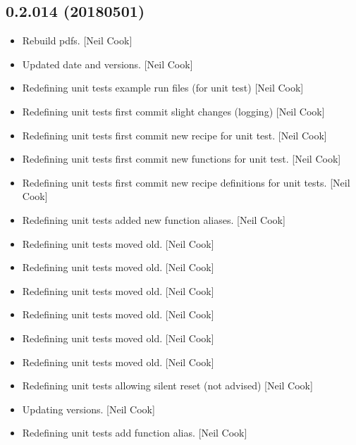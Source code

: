 \documentclass[a4paper,10pt,english]{report}
\begin{document}
\subsection{0.2.014 (2018\sphinxhyphen{}05\sphinxhyphen{}01)}
\label{\detokenize{misc/changelog:id466}}\begin{itemize}
\item {} 
Rebuild pdfs. {[}Neil Cook{]}

\item {} 
Updated date and versions. {[}Neil Cook{]}

\item {} 
Redefining unit tests \sphinxhyphen{} example run files (for unit test) {[}Neil Cook{]}

\item {} 
Redefining unit tests \sphinxhyphen{} first commit \sphinxhyphen{} slight changes (logging) {[}Neil
Cook{]}

\item {} 
Redefining unit tests \sphinxhyphen{} first commit \sphinxhyphen{} new recipe for unit test. {[}Neil
Cook{]}

\item {} 
Redefining unit tests \sphinxhyphen{} first commit \sphinxhyphen{} new functions for unit test.
{[}Neil Cook{]}

\item {} 
Redefining unit tests \sphinxhyphen{} first commit \sphinxhyphen{} new recipe definitions for unit
tests. {[}Neil Cook{]}

\item {} 
Redefining unit tests \sphinxhyphen{} added new function aliases. {[}Neil Cook{]}

\item {} 
Redefining unit tests \sphinxhyphen{} moved old. {[}Neil Cook{]}

\item {} 
Redefining unit tests \sphinxhyphen{} moved old. {[}Neil Cook{]}

\item {} 
Redefining unit tests \sphinxhyphen{} moved old. {[}Neil Cook{]}

\item {} 
Redefining unit tests \sphinxhyphen{} moved old. {[}Neil Cook{]}

\item {} 
Redefining unit tests \sphinxhyphen{} moved old. {[}Neil Cook{]}

\item {} 
Redefining unit tests \sphinxhyphen{} moved old. {[}Neil Cook{]}

\item {} 
Redefining unit tests \sphinxhyphen{} allowing silent reset (not advised) {[}Neil
Cook{]}

\item {} 
Updating versions. {[}Neil Cook{]}

\item {} 
Redefining unit tests \sphinxhyphen{} add function alias. {[}Neil Cook{]}

\end{itemize}
\end{document}
